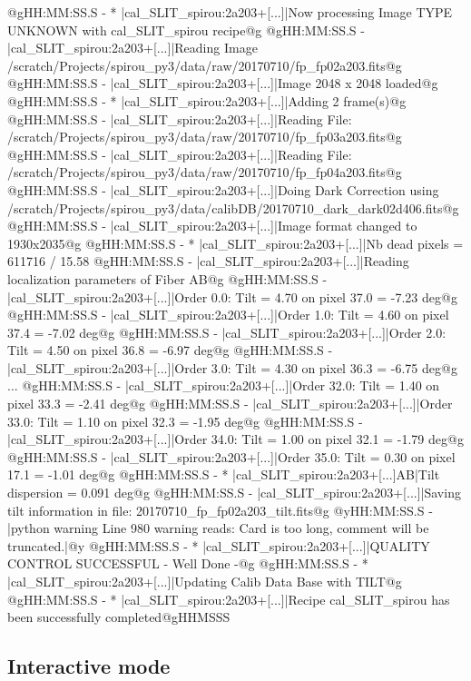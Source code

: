 \begin{cmdboxprintspecial}[fontupper=\tiny, fontlower=\tiny]
@gHH:MM:SS.S - * |cal_SLIT_spirou:2a203+[...]|Now processing Image TYPE UNKNOWN with cal_SLIT_spirou recipe@g
@gHH:MM:SS.S -   |cal_SLIT_spirou:2a203+[...]|Reading Image /scratch/Projects/spirou_py3/data/raw/20170710/fp_fp02a203.fits@g
@gHH:MM:SS.S -   |cal_SLIT_spirou:2a203+[...]|Image 2048 x 2048 loaded@g
@gHH:MM:SS.S - * |cal_SLIT_spirou:2a203+[...]|Adding 2 frame(s)@g
@gHH:MM:SS.S -   |cal_SLIT_spirou:2a203+[...]|Reading File: /scratch/Projects/spirou_py3/data/raw/20170710/fp_fp03a203.fits@g
@gHH:MM:SS.S -   |cal_SLIT_spirou:2a203+[...]|Reading File: /scratch/Projects/spirou_py3/data/raw/20170710/fp_fp04a203.fits@g
@gHH:MM:SS.S -   |cal_SLIT_spirou:2a203+[...]|Doing Dark Correction using /scratch/Projects/spirou_py3/data/calibDB/20170710_dark_dark02d406.fits@g
@gHH:MM:SS.S -   |cal_SLIT_spirou:2a203+[...]|Image format changed to 1930x2035@g
@gHH:MM:SS.S - * |cal_SLIT_spirou:2a203+[...]|Nb dead pixels = 611716 / 15.58 %
@gHH:MM:SS.S -   |cal_SLIT_spirou:2a203+[...]|Reading localization parameters of Fiber AB@g
@gHH:MM:SS.S -   |cal_SLIT_spirou:2a203+[...]|Order 0.0: Tilt = 4.70 on pixel 37.0 = -7.23 deg@g
@gHH:MM:SS.S -   |cal_SLIT_spirou:2a203+[...]|Order 1.0: Tilt = 4.60 on pixel 37.4 = -7.02 deg@g
@gHH:MM:SS.S -   |cal_SLIT_spirou:2a203+[...]|Order 2.0: Tilt = 4.50 on pixel 36.8 = -6.97 deg@g
@gHH:MM:SS.S -   |cal_SLIT_spirou:2a203+[...]|Order 3.0: Tilt = 4.30 on pixel 36.3 = -6.75 deg@g
...
@gHH:MM:SS.S -   |cal_SLIT_spirou:2a203+[...]|Order 32.0: Tilt = 1.40 on pixel 33.3 = -2.41 deg@g
@gHH:MM:SS.S -   |cal_SLIT_spirou:2a203+[...]|Order 33.0: Tilt = 1.10 on pixel 32.3 = -1.95 deg@g
@gHH:MM:SS.S -   |cal_SLIT_spirou:2a203+[...]|Order 34.0: Tilt = 1.00 on pixel 32.1 = -1.79 deg@g
@gHH:MM:SS.S -   |cal_SLIT_spirou:2a203+[...]|Order 35.0: Tilt = 0.30 on pixel 17.1 = -1.01 deg@g
@gHH:MM:SS.S - * |cal_SLIT_spirou:2a203+[...]AB|Tilt dispersion = 0.091 deg@g
@gHH:MM:SS.S -   |cal_SLIT_spirou:2a203+[...]|Saving tilt  information in file: 20170710_fp_fp02a203_tilt.fits@g
@yHH:MM:SS.S - \@ |python warning Line 980  warning reads: Card is too long, comment will be truncated.|@y
@gHH:MM:SS.S - * |cal_SLIT_spirou:2a203+[...]|QUALITY CONTROL SUCCESSFUL - Well Done -@g
@gHH:MM:SS.S - * |cal_SLIT_spirou:2a203+[...]|Updating Calib Data Base with TILT@g
@gHH:MM:SS.S - * |cal_SLIT_spirou:2a203+[...]|Recipe cal_SLIT_spirou has been successfully completed@gHHMSSS
\end{cmdboxprintspecial}


\newpage
\subsection{Interactive mode}

